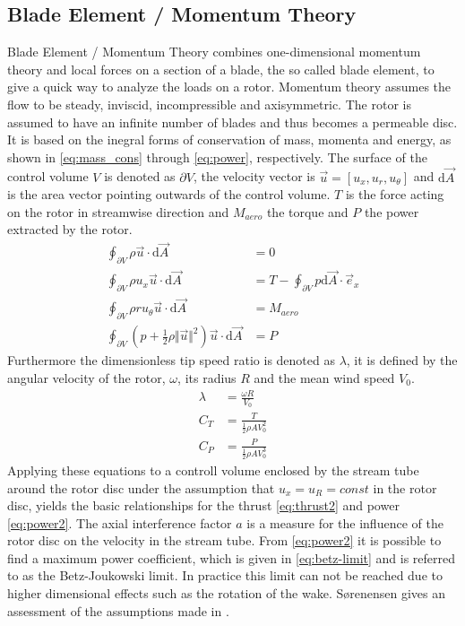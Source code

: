\subsection{Blade Element / Momentum Theory}
Blade Element / Momentum Theory combines one-dimensional momentum theory and local forces on a section of a blade, the so called blade element, to give a quick way to analyze the loads on a rotor. Momentum theory assumes the flow to be steady, inviscid, incompressible and axisymmetric. The rotor is assumed to have an infinite number of blades and thus becomes a permeable disc. It is based on the inegral forms of conservation of mass, momenta and energy, as shown in \eqref{eq:mass_cons} through \eqref{eq:power}, respectively. The surface of the control volume $V$ is denoted as $\partial V$, the velocity vector is $\vec{u}= \left[u_x, u_r, u_\theta \right]$  and $\mathrm{d}\vec{A}$ is the area vector pointing outwards of the control volume. $T$ is the force acting on the rotor in streamwise direction and $M_{aero}$ the torque and $P$ the power extracted by the rotor. 
\begin{align}
	\oint_{\partial V} \rho \vec{u} \cdot \mathrm{d}\vec{A} &= 0 \label{eq:mass_cons}\\
	\oint_{\partial V} \rho u_x \vec{u} \cdot \mathrm{d}\vec{A} &= T - \oint_{\partial V} p \mathrm{d} \vec{A} \cdot \vec{e}_x \label{eq:thrust} \\
	\oint_{\partial V} \rho r u_\theta \vec{u} \cdot \mathrm{d} \vec{A} &= M_{aero} \label{eq:torque}\\
	\oint_{\partial V} \left(p + \frac{1}{2} \rho \Vert\vec{u} \Vert^2\right) \vec{u} \cdot \mathrm{d} \vec{A} &= P \label{eq:power}
\end{align}	
Furthermore the dimensionless tip speed ratio is denoted as $\lambda$, it is defined by the angular velocity of the rotor, $\omega$, its radius $R$ and the mean wind speed $V_0$. \cite[p. 7 - 8]{sorensen_general_2016}
\begin{align}
	\lambda &= \frac{\omega R}{V_0} \\
	C_T &= \frac{T}{\frac{1}{2} \rho A V_0^2} \\
	C_P &= \frac{P}{\frac{1}{2} \rho A V_0^3} 
\end{align}
Applying these equations to a controll volume enclosed by the stream tube around the rotor disc under the assumption that $u_x = u_R = const$ in the rotor disc, yields the basic relationships for the thrust \eqref{eq:thrust2} and power \eqref{eq:power2}. The axial interference factor $a$ is a measure for the influence of the rotor disc on the velocity in the stream tube.  From \eqref{eq:power2} it is possible to find a maximum power coefficient, which is given in \eqref{eq:betz-limit} and is referred to as the Betz-Joukowski limit. In practice this limit can not be reached due to higher dimensional effects such as the rotation of the wake. \cite[p.10 - 11]{sorensen_general_2016} Sørenensen gives an assessment of the assumptions made in \cite{sorensen_general_2016}. 
